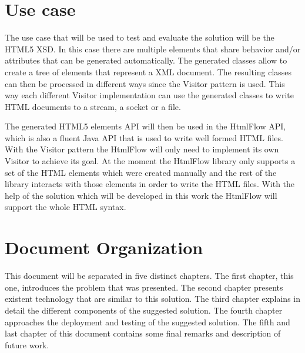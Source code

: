\section{Use case}

The use case that will be used to test and evaluate the solution will be the \ac{HTML}5 \ac{XSD}. In this case there are multiple elements that share behavior and/or attributes that can be generated automatically. The generated classes allow to create a tree of elements that represent a \ac{XML} document. The resulting classes can then be processed in different ways since the Visitor pattern is used. This way each different Visitor implementation can use the generated classes to write \ac{HTML} documents to a stream, a socket or a file. 

\noindent
The generated \ac{HTML}5 elements \ac{API} will then be used in the HtmlFlow \ac{API}, which is also a fluent Java \ac{API} that is used to write well formed \ac{HTML} files. With the Visitor pattern the HtmlFlow will only need to implement its own Visitor to achieve its goal. At the moment the HtmlFlow library only supports a set of the \ac{HTML} elements which were created manually and the rest of the library interacts with those elements in order to write the \ac{HTML} files. With the help of the solution which will be developed in this work the HtmlFlow will support the whole \ac{HTML} syntax. 

\section{Document Organization}

This document will be separated in five distinct chapters. The first chapter, this one, introduces the problem that was presented. The second chapter presents existent technology that are similar to this solution. The third chapter explains in detail the different components of the suggested solution. The fourth chapter approaches the deployment and testing of the suggested solution. The fifth and last chapter of this document contains some final remarks and description of future work.